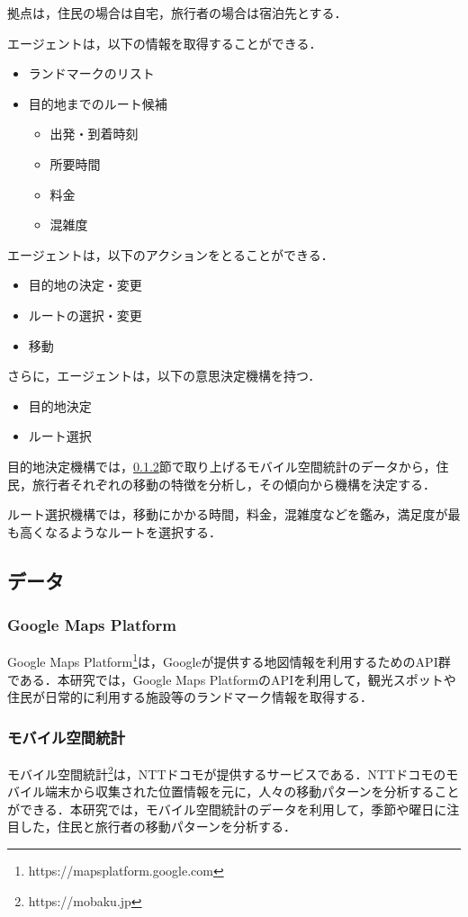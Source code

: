 拠点は，住民の場合は自宅，旅行者の場合は宿泊先とする．

エージェントは，以下の情報を取得することができる．
\begin{itemize}
  \item ランドマークのリスト
  \item 目的地までのルート候補
    \begin{itemize}
      \item 出発・到着時刻
      \item 所要時間
      \item 料金
      \item 混雑度
    \end{itemize}
\end{itemize}

エージェントは，以下のアクションをとることができる．
\begin{itemize}
  \item 目的地の決定・変更
  \item ルートの選択・変更
  \item 移動
\end{itemize}

さらに，エージェントは，以下の意思決定機構を持つ．
\begin{itemize}
  \item 目的地決定
  \item ルート選択
\end{itemize}

目的地決定機構では，\ref{section_mobaku}節で取り上げるモバイル空間統計のデータから，住民，旅行者それぞれの移動の特徴を分析し，その傾向から機構を決定する．

ルート選択機構では，移動にかかる時間，料金，混雑度などを鑑み，満足度が最も高くなるようなルートを選択する．

\subsection{データ}
\subsubsection{Google Maps Platform}
Google Maps Platform\footnote{https://mapsplatform.google.com}は，Googleが提供する地図情報を利用するためのAPI群である．本研究では，Google Maps PlatformのAPIを利用して，観光スポットや住民が日常的に利用する施設等のランドマーク情報を取得する．

\subsubsection{モバイル空間統計}
\label{section_mobaku}
モバイル空間統計\footnote{https://mobaku.jp}は，NTTドコモが提供するサービスである．NTTドコモのモバイル端末から収集された位置情報を元に，人々の移動パターンを分析することができる．本研究では，モバイル空間統計のデータを利用して，季節や曜日に注目した，住民と旅行者の移動パターンを分析する．

